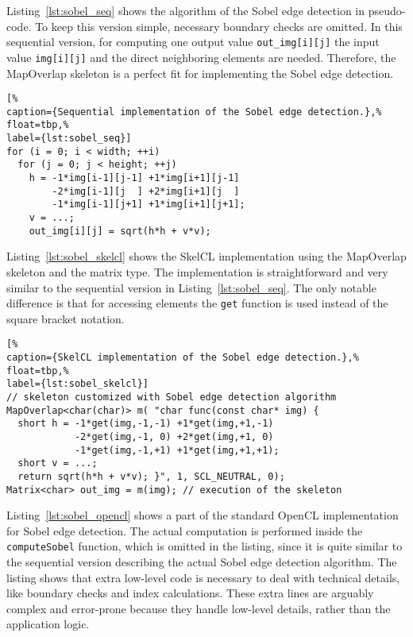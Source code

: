 Listing~\ref{lst:sobel_seq} shows the algorithm of the Sobel edge detection in pseudo-code.
To keep this version simple, necessary boundary checks are omitted.
In this sequential version, for computing one output value \texttt{out\_img[i][j]} the input value \texttt{img[i][j]} and the direct neighboring elements are needed.
Therefore, the MapOverlap skeleton is a perfect fit for implementing the Sobel edge detection.
\begin{lstlisting}[%
caption={Sequential implementation of the Sobel edge detection.},%
float=tbp,%
label={lst:sobel_seq}]
for (i = 0; i < width; ++i)
  for (j = 0; j < height; ++j)
    h = -1*img[i-1][j-1] +1*img[i+1][j-1]
        -2*img[i-1][j  ] +2*img[i+1][j  ]
        -1*img[i-1][j+1] +1*img[i+1][j+1];
    v = ...;
    out_img[i][j] = sqrt(h*h + v*v);
\end{lstlisting}

Listing~\ref{lst:sobel_skelcl} shows the SkelCL implementation using the MapOverlap skeleton and the matrix type.
The implementation is straightforward and very similar to the sequential version in Listing~\ref{lst:sobel_seq}.
The only notable difference is that for accessing elements the \texttt{get} function is used instead of the square bracket notation.

\begin{lstlisting}[%
caption={SkelCL implementation of the Sobel edge detection.},%
float=tbp,%
label={lst:sobel_skelcl}]
// skeleton customized with Sobel edge detection algorithm
MapOverlap<char(char)> m( "char func(const char* img) {
  short h = -1*get(img,-1,-1) +1*get(img,+1,-1)
            -2*get(img,-1, 0) +2*get(img,+1, 0)
            -1*get(img,-1,+1) +1*get(img,+1,+1);
  short v = ...;
  return sqrt(h*h + v*v); }", 1, SCL_NEUTRAL, 0);
Matrix<char> out_img = m(img); // execution of the skeleton
\end{lstlisting}

Listing~\ref{lst:sobel_opencl} shows a part of the standard OpenCL implementation for Sobel edge detection.
The actual computation is performed inside the \texttt{computeSobel} function, which is omitted in the listing, since it is quite similar to the sequential version describing the actual Sobel edge detection algorithm.
The listing shows that extra low-level code is necessary to deal with technical details, like boundary checks and index calculations.
These extra lines are arguably complex and error-prone because they handle low-level details, rather than the application logic.

